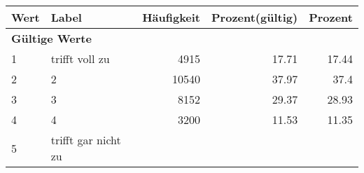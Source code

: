      \begin{longtable}{lXrrr}
     \toprule
     \textbf{Wert} & \textbf{Label} & \textbf{Häufigkeit} & \textbf{Prozent(gültig)} & \textbf{Prozent} \\
     \endhead
     \midrule
     \multicolumn{5}{l}{\textbf{Gültige Werte}}\\

     1 &
     \multicolumn{1}{X}{ trifft voll zu   } &


       \num{4915} &
       \num[round-mode=places,round-precision=2]{17,71} &
         \num[round-mode=places,round-precision=2]{17,44} \\

     2 &
     \multicolumn{1}{X}{ 2   } &


       \num{10540} &
       \num[round-mode=places,round-precision=2]{37,97} &
         \num[round-mode=places,round-precision=2]{37,4} \\

     3 &
     \multicolumn{1}{X}{ 3   } &


       \num{8152} &
       \num[round-mode=places,round-precision=2]{29,37} &
         \num[round-mode=places,round-precision=2]{28,93} \\

     4 &
     \multicolumn{1}{X}{ 4   } &


       \num{3200} &
       \num[round-mode=places,round-precision=2]{11,53} &
         \num[round-mode=places,round-precision=2]{11,35} \\

     5 &
     \multicolumn{1}{X}{ trifft gar nicht zu   } &



\end{longtable}
